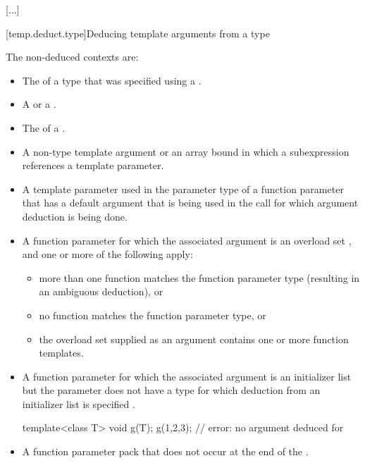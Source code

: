 \documentclass{wg21}
\begin{document}
\textcolor{noteclr}{[...]}

[temp.deduct.type]{Deducing template arguments from a type}



\pnum
The non-deduced contexts are:

%
\begin{itemize}
    \item
    The
    of a type that was specified using a
    .
    \item A  or a .
    \item
    The  of a .
    \item
    A non-type template argument or an array bound in which a subexpression
    references a template parameter.
    \item
    A template parameter used in the parameter type of a function parameter that
    has a default argument that is being used in the call for which argument
    deduction is being done.
    \item
    A function parameter for which the associated argument is an
    overload set , and one or more of the following apply:
    \begin{itemize}
        \item
        more than one function matches the function parameter type (resulting in
        an ambiguous deduction), or
        \item
        no function matches the function parameter type, or
        \item
        the overload set supplied as an argument contains one or more function templates.
    \end{itemize}
    \item A function parameter for which the associated argument is an initializer
    list  but the parameter does not have
    a type for which deduction from an initializer list is specified .
    \begin{example}
        \begin{codeblock}
            template<class T> void g(T);
            g({1,2,3});                 // error: no argument deduced for 
        \end{codeblock}
    \end{example}
    \item A function parameter pack that does not occur at the end of the
    .
\end{itemize}
\end{document}
